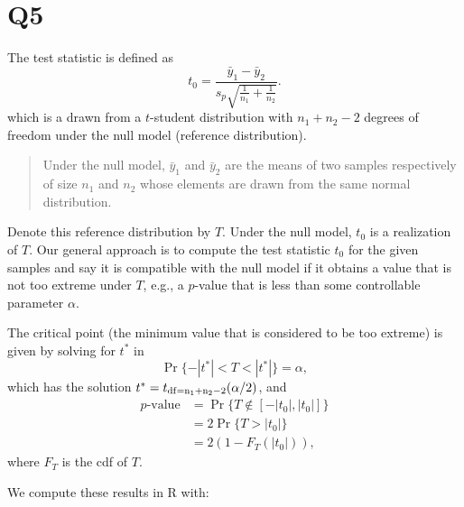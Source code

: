 \documentclass[
  11pt,
]{article}
\begin{document}
\hypertarget{q5}{%
\section{Q5}\label{q5}}


The test statistic is defined as \[
  t_0 = \frac{\bar{y}_1-\bar{y}_2}{s_p \sqrt{\frac{1}{n_1}+\frac{1}{n_2}}}.
\] which is a drawn from a \(t\)-student distribution with \(n_1+n_2-2\)
degrees of freedom under the null model (reference distribution).

\begin{quote}
Under the null model, \(\bar{y}_1\) and \(\bar{y}_2\) are the means of
two samples respectively of size \(n_1\) and \(n_2\) whose elements are
drawn from the same normal distribution.
\end{quote}

Denote this reference distribution by \(T\). Under the null model,
\(t_0\) is a realization of \(T\). Our general approach is to compute
the test statistic \(t_0\) for the given samples and say it is
compatible with the null model if it obtains a value that is not too
extreme under \(T\), e.g., a \(p\)-value that is less than some
controllable parameter \(\alpha\).

The critical point (the minimum value that is considered to be too
extreme) is given by solving for \(t^*\) in \[
  \Pr\{-|t^*| < T < |t^*|\} = \alpha,
\] which has the solution \(t^* = t_{\rm{df}=n_1+n_2-2}(\alpha/2)\), and
\begin{align*}
  \text{$p$-value} &= \Pr\{T \notin [-|t_0|,|t_0|]\}\\
                   &= 2 \Pr\{T > |t_0|\}\\
                   &= 2(1-F_T(|t_0|)),
\end{align*} where \(F_T\) is the cdf of \(T\).

We compute these results in R with:
\end{document}
